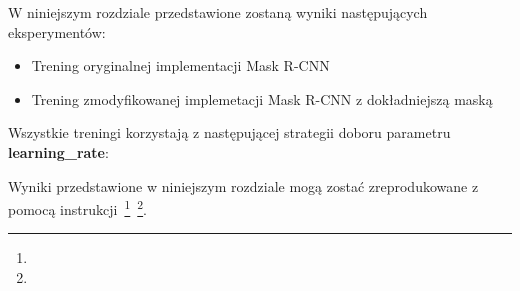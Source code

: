 
W niniejszym rozdziale przedstawione zostaną wyniki następujących eksperymentów:

\begin{itemize}
 \item Trening oryginalnej implementacji Mask R-CNN
 \item Trening zmodyfikowanej implemetacji Mask R-CNN z dokładniejszą maską
\end{itemize}

Wszystkie treningi korzystają z następującej strategii doboru parametru \textbf{learning\_rate}:


Wyniki przedstawione w niniejszym rozdziale mogą zostać zreprodukowane z pomocą instrukcji~\footnote{}~\footnote{}.
